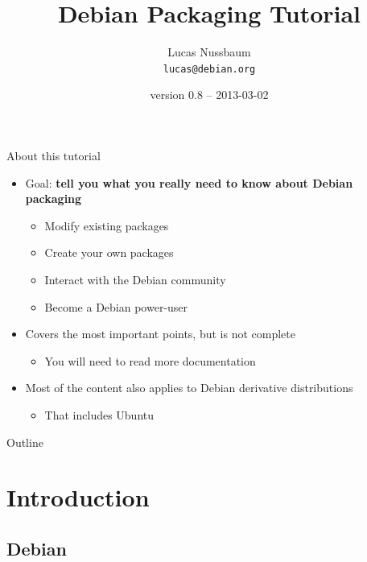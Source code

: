 \documentclass[10pt,final]{beamer}
\title{Debian Packaging Tutorial}
\author[]{Lucas Nussbaum\\{\small\texttt{lucas@debian.org}}}
\date{\footnotesize version 0.8 -- 2013-03-02} %
\begin{document}
\frame{\titlepage}

\begin{frame}{About this tutorial}
  \begin{itemize}
  \item Goal: \textbf{tell you what you really need to know about Debian packaging}
    \begin{itemize}
      \hbr
    \item Modify existing packages
      \hbr
    \item Create your own packages
	    \hbr
    \item Interact with the Debian community
      \hbr
    \item Become a Debian power-user
    \end{itemize}
    \br
  \item Covers the most important points, but is not complete
    \begin{itemize}
    \item You will need to read more documentation
    \end{itemize}
    \br
  \item Most of the content also applies to Debian derivative distributions
    \begin{itemize}
      \hbr
    \item That includes Ubuntu
    \end{itemize}
  \end{itemize}
\end{frame}

\begin{frame}{Outline}
  \tableofcontents[hideallsubsections]
\end{frame}

\section{Introduction}

\subsection{Debian}
\end{document}
